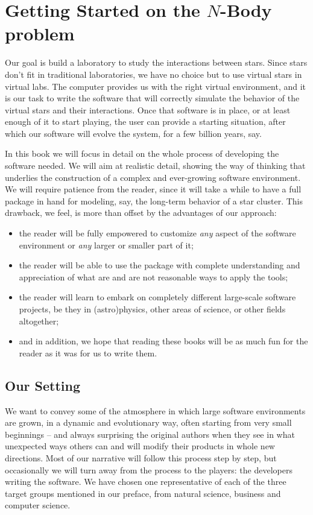 \chapter{Getting Started on the $N$-Body problem}

Our goal is build a laboratory to study the interactions between stars.
Since stars don't fit in traditional laboratories, we have no choice
but to use virtual stars in virtual labs.  The computer provides us
with the right virtual environment, and it is our task to write the
software that will correctly simulate the behavior of the virtual stars
and their interactions.  Once that software is in place, or at least
enough of it to start playing, the user can provide a starting situation,
after which our software will evolve the system, for a few billion years,
say.

In this book we will focus in detail on the whole process of developing
the software needed.  We will aim at realistic detail, showing the way
of thinking that underlies the construction of a complex and ever-growing
software environment.  We will require patience from the reader, since it
will take a while to have a full package in hand for modeling, say,
the long-term behavior of a star cluster.  This drawback, we feel, is
more than offset by the advantages of our approach:

\begin{itemize}
\item
the reader will be fully empowered to customize {\it any}
aspect of the software environment or {\it any} larger or smaller part of it;
\item
the reader will be able to use the package with complete
understanding and appreciation of what are and are not reasonable ways
to apply the tools;
\item
the reader will learn to embark on completely different large-scale
software projects, be they in (astro)physics, other areas of science,
or other fields altogether; 
\item
and in addition, we hope that reading these books will be as much fun
for the reader as it was for us to write them.
\end{itemize}

\section{Our Setting}

We want to convey some of the atmosphere in which large software
environments are grown, in a dynamic and evolutionary way, often
starting from very small beginnings -- and always surprising the
original authors when they see in what unexpected ways others can
and will modify their products in whole new directions.  Most of our
narrative will follow this process step by step, but occasionally we
will turn away from the process to the players: the developers writing
the software.  We have chosen one representative of each of the three
target groups mentioned in our preface, from natural science, business
and computer science.


